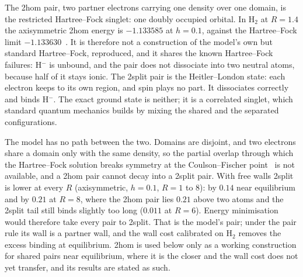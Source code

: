 \documentclass[11pt]{article}
\begin{document}
The 2hom pair, two partner electrons carrying one density over one domain, is the restricted
Hartree--Fock singlet: one doubly occupied orbital. In H$_2$ at $R = 1.4$ the axisymmetric 2hom energy is
$-1.133585$ at $h = 0.1$, against the Hartree--Fock limit $-1.133630$~\cite{kolos}. It is therefore not a
construction of the model's own but standard Hartree--Fock, reproduced, and it shares the known
Hartree--Fock failures: H$^-$ is unbound, and the pair does not dissociate into two neutral atoms,
because half of it stays ionic. The 2split pair is the Heitler--London state: each electron keeps to its
own region, and spin plays no part. It dissociates correctly and binds H$^-$. The exact ground state is
neither; it is a correlated singlet, which standard quantum mechanics builds by mixing the shared and
the separated configurations.

The model has no path between the two. Domains are disjoint, and two electrons share a domain only
with the same density, so the partial overlap through which the Hartree--Fock solution breaks symmetry
at the Coulson--Fischer point~\cite{coulson} is not available, and a 2hom pair cannot decay into a 2split
pair. With free walls 2split is lower at every $R$ (axisymmetric, $h = 0.1$, $R = 1$ to $8$): by $0.14$ near
equilibrium and by $0.21$ at $R = 8$, where the 2hom pair lies $0.21$ above two atoms and the 2split tail
still binds slightly too long ($0.011$ at $R = 6$). Energy minimisation would therefore take every pair to
2split. That is the model's pair; under the pair rule its wall is a partner wall, and the wall cost
calibrated on H$_2$ removes the excess binding at equilibrium. 2hom is used below only as a working
construction for shared pairs near equilibrium, where it is the closer and the wall cost does not yet
transfer, and its results are stated as such.
\end{document}
